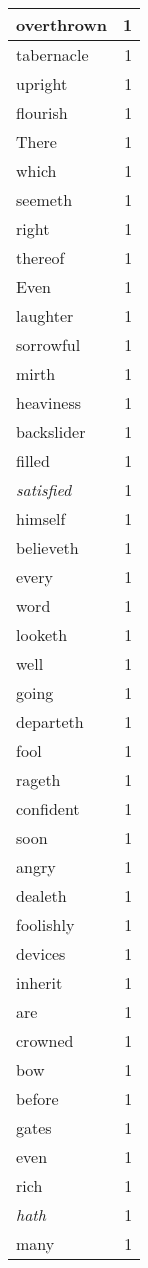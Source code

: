 \begin{center}
\begin{longtable}{l|r}
overthrown & 1\\ \hline 
tabernacle & 1\\ \hline 
upright & 1\\ \hline 
flourish & 1\\ \hline 
There & 1\\ \hline 
which & 1\\ \hline 
seemeth & 1\\ \hline 
right & 1\\ \hline 
thereof & 1\\ \hline 
Even & 1\\ \hline 
laughter & 1\\ \hline 
sorrowful & 1\\ \hline 
mirth & 1\\ \hline 
heaviness & 1\\ \hline 
backslider & 1\\ \hline 
filled & 1\\ \hline 
\emph{satisfied} & 1\\ \hline 
himself & 1\\ \hline 
believeth & 1\\ \hline 
every & 1\\ \hline 
word & 1\\ \hline 
looketh & 1\\ \hline 
well & 1\\ \hline 
going & 1\\ \hline 
departeth & 1\\ \hline 
fool & 1\\ \hline 
rageth & 1\\ \hline 
confident & 1\\ \hline 
soon & 1\\ \hline 
angry & 1\\ \hline 
dealeth & 1\\ \hline 
foolishly & 1\\ \hline 
devices & 1\\ \hline 
inherit & 1\\ \hline 
are & 1\\ \hline 
crowned & 1\\ \hline 
bow & 1\\ \hline 
before & 1\\ \hline 
gates & 1\\ \hline 
even & 1\\ \hline 
rich & 1\\ \hline 
\emph{hath} & 1\\ \hline 
many & 1\\ \hline 

\end{longtable}
\end{center}
